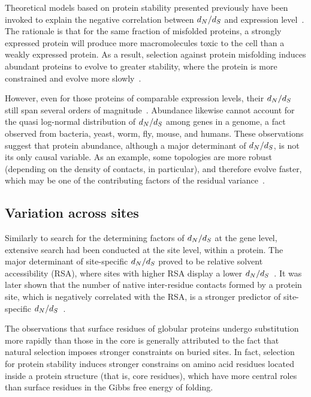 Theoretical models based on protein stability presented previously have been invoked to explain the negative correlation between $d_N / d_S$ and expression level~\citep{Wilke2006, Drummond2008}.
The rationale is that for the same fraction of misfolded proteins, a strongly expressed protein will produce more macromolecules toxic to the cell than a weakly expressed protein.
As a result, selection against protein misfolding induces abundant proteins to evolve to greater stability, where the protein is more constrained and evolve more slowly~\citep{Serohijos2012}.

However, even for those proteins of comparable expression levels, their $d_N / d_S$ still span several orders of magnitude~\citep{Drummond2008}.
Abundance likewise cannot account for the quasi log-normal distribution of $d_N / d_S$ among genes in a genome, a fact observed from bacteria, yeast, worm, fly, mouse, and humans.
These observations suggest that protein abundance, although a major determinant of $d_N / d_S$, is not its only causal variable.
As an example, some topologies are more robust (depending on the density of contacts, in particular), and therefore evolve faster, which may be one of the contributing factors of the residual variance~\citep{Echave2017}.

\subsection{Variation across sites}
\label{subsec:thermo-variation-across-sites}

Similarly to search for the determining factors of $d_N / d_S$ at the gene level, extensive search had been conducted at the site level, within a protein.
The major determinant of site-specific $d_N / d_S$ proved to be relative solvent accessibility (RSA), where sites with higher RSA display a lower $d_N / d_S$~\citep{Ramsey2011}.
It was later shown that the number of native inter-residue contacts formed by a protein site, which is negatively correlated with the RSA, is a stronger predictor of site-specific $d_N / d_S$~\citep{Yeh2013}.

The observations that surface residues of globular proteins undergo substitution more rapidly than those in the core is generally attributed to the fact that natural selection imposes stronger constraints on buried sites.
In fact, selection for protein stability induces stronger constrains on amino acid residues located inside a protein structure (that is, core residues), which have more central roles than surface residues in the Gibbs free energy of folding.

